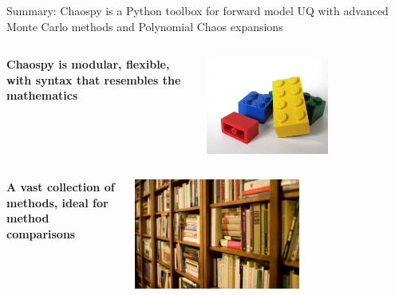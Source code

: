 \documentclass[handout]{beamer}
\begin{document}
\begin{frame}{Summary: Chaospy is a Python toolbox for forward model UQ with advanced Monte Carlo methods and Polynomial Chaos expansions}
\vspace{-5mm}
\begin{columns}

     \begin{center}
      \bf{Chaospy is modular, flexible, with syntax that resembles the mathematics}
     \end{center}
     \begin{center}
            \includegraphics[width=0.6\textwidth]{lego.jpg}
     \end{center}

 \end{columns}

\vspace{10mm}

\begin{columns}
  \begin{center}
   \bf{A vast collection of methods, ideal for method comparisons}
  \end{center}
     \begin{center}
            \includegraphics[width=0.6\textwidth]{bookshelf.jpg}
     \end{center}


\end{columns}
\end{frame}
\end{document}
